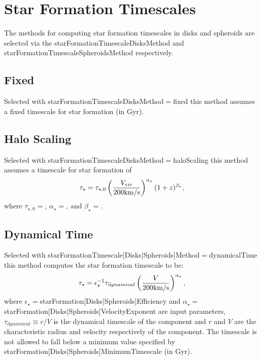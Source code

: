 \section{Star Formation Timescales}

The methods for computing star formation timescales in disks and spheroids are selected via the {\normalfont \ttfamily starFormationTimescaleDisksMethod} and {\normalfont \ttfamily starFormationTimescaleSpheroidsMethod} respectively.

\subsection{Fixed}

Selected with {\normalfont \ttfamily starFormationTimescaleDisksMethod}$=${\normalfont \ttfamily fixed} this method assumes a fixed timescale for star formation {\normalfont \ttfamily [starFormationTimescaleDisksFixedTimescale]} (in Gyr).

\subsection{Halo Scaling}

Selected with {\normalfont \ttfamily starFormationTimescaleDisksMethod}$=${\normalfont \ttfamily haloScaling} this method assumes a timescale for star formation of
\begin{equation}
 \tau_\star = \tau_{\mathrm \star,0} \left( {V_{\mathrm vir} \over 200\hbox{km/s}} \right)^{\alpha_\star} (1+z)^{\beta_\star},
\end{equation}
where $\tau_{\mathrm \star,0}=${\normalfont \ttfamily [starFormationTimescaleDisksHaloScalingTimescale]}, $\alpha_\star=${\normalfont \ttfamily [starFormationTimescaleDisksHaloScalingVirialVelocityExponent]}, and $\beta_\star=${\normalfont \ttfamily [starFormationTimescaleDisksHaloScalingRedshiftExponent]}.

\subsection{Dynamical Time}

Selected with {\normalfont \ttfamily starFormationTimescale[Disks|Spheroids]Method}$=${\normalfont \ttfamily dynamicalTime} this method computes the star formation timescale to be:
\begin{equation}
 \tau_\star = \epsilon_\star^{-1} \tau_{\mathrm dynamical} \left( {V \over 200\hbox{km/s}} \right)^{\alpha_\star},
\end{equation}
where $\epsilon_\star=${\normalfont \ttfamily starFormation[Disks|Spheroids]Efficiency} and $\alpha_\star=${\normalfont \ttfamily starFormation[Disks|Spheroids]VelocityExponent} are input parameters, $\tau_{\mathrm dynamical}\equiv r/V$ is the dynamical timescale of the \gls{component} and $r$ and $V$ are the characteristic radius and velocity respectively of the component. The timescale is not allowed to fall below a minimum value specified by {\normalfont \ttfamily starFormation[Disks|Spheroids]MinimumTimescale} (in Gyr).

